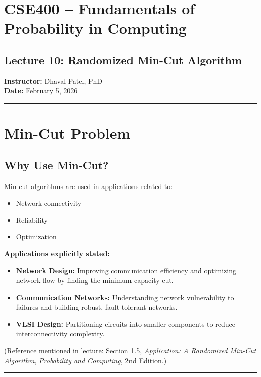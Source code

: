 \documentclass[12pt]{article}
\begin{document}
\section*{CSE400 – Fundamentals of Probability in Computing}

\subsection*{Lecture 10: Randomized Min-Cut Algorithm}

\textbf{Instructor:} Dhaval Patel, PhD \\
\textbf{Date:} February 5, 2026

\hrule
\vspace{1em}

\section{Min-Cut Problem}

\subsection{Why Use Min-Cut?}

Min-cut algorithms are used in applications related to:
\begin{itemize}
    \item Network connectivity
    \item Reliability
    \item Optimization
\end{itemize}

\textbf{Applications explicitly stated:}
\begin{itemize}
    \item \textbf{Network Design:} Improving communication efficiency and optimizing network flow by finding the minimum capacity cut.
    \item \textbf{Communication Networks:} Understanding network vulnerability to failures and building robust, fault-tolerant networks.
    \item \textbf{VLSI Design:} Partitioning circuits into smaller components to reduce interconnectivity complexity.
\end{itemize}

(Reference mentioned in lecture: Section 1.5, \textit{Application: A Randomized Min-Cut Algorithm}, \textit{Probability and Computing}, 2nd Edition.)

\hrule
\vspace{1em}
\end{document}

